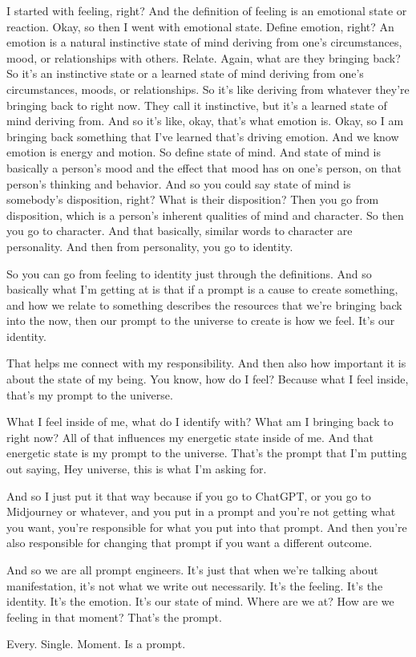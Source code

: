 \documentclass{article}
\begin{document}
I started with feeling, right? And the definition of feeling is an emotional state or reaction. Okay, so then I went with emotional state. Define emotion, right? An emotion is a natural instinctive state of mind deriving from one's circumstances, mood, or relationships with others. Relate. Again, what are they bringing back? So it's an instinctive state or a learned state of mind deriving from one's circumstances, moods, or relationships. So it's like deriving from whatever they're bringing back to right now. They call it instinctive, but it's a learned state of mind deriving from. And so it's like, okay, that's what emotion is. Okay, so I am bringing back something that I've learned that's driving emotion. And we know emotion is energy and motion. So define state of mind. And state of mind is basically a person's mood and the effect that mood has on one's person,
on that person's thinking and behavior. And so you could say state of mind is somebody's
disposition, right? What is their disposition? Then you go from disposition, which is a person's
inherent qualities of mind and character. So then you go to character. And that basically,
similar words to character are personality. And then from personality, you go to identity.

\medskip

So you can go from feeling to identity just through the definitions. And so basically what
I'm getting at is that if a prompt is a cause to create something, and how we relate to something
describes the resources that we're bringing back into the now, then our prompt to the universe to create is how we feel. It's our identity. 

\medskip

That helps me connect with my responsibility. And then also how important it is about the state of my being. You know, how do I feel? Because what I feel inside, that's my prompt to the universe. 

\medskip

What I feel inside of me, what do I identify with? What am I bringing back to right now? All of that influences my energetic state inside of me. And that energetic state is my prompt to the universe. That's the prompt that I'm putting out saying, Hey universe, this is what I'm asking for. 

\medskip

And so I just put it that way because if you go to ChatGPT, or you go to Midjourney or whatever, and you put in a prompt and you're not getting what you want, you're responsible for what you put into that prompt. And then you're also responsible for changing that prompt if you want a different outcome. 

\medskip

And so we are all prompt engineers. It's just that when we're talking about manifestation,
it's not what we write out necessarily. It's the feeling. It's the identity. It's the emotion. It's
our state of mind. Where are we at? How are we feeling in that moment? That's the prompt. 

\medskip

Every. Single. Moment. Is a prompt.
\end{document}
